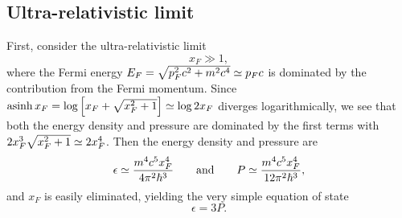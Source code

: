 \subsection{Ultra-relativistic limit}
\label{sec:nstars:ur_limit}

First, consider the ultra-relativistic limit
\begin{equation}
	x_F \gg 1 , 
\label{eq:nstars:ur_limit}
\end{equation}
where the Fermi energy $E_F = \sqrt{p_F^2 c^2 + m^2 c^4} \simeq p_F c$ is dominated by the contribution from the Fermi momentum.
Since $\operatorname{asinh} x_F = \log \left[ x_F + \sqrt{x_F^2 + 1} \right] \simeq \log 2 x_F$ diverges logarithmically, we see that both the energy density and pressure are dominated by the first terms with $2 x_F^3 \sqrt{x_F^2 + 1} \simeq 2 x_F^4$.
Then the energy density and pressure are
\begin{equation}
	\epsilon \simeq \frac{m^4 c^5 x_F^4}{4 \pi^2 \hbar^3}
	\qquad \text{and} \qquad
	P        \simeq \frac{m^4 c^5 x_F^4}{12 \pi^2 \hbar^3},
\end{equation}
and $x_F$ is easily eliminated, yielding the very simple equation of state
\begin{equation}
	\epsilon = 3 P .
\label{eq:nstars:ur_eos}
\end{equation}

